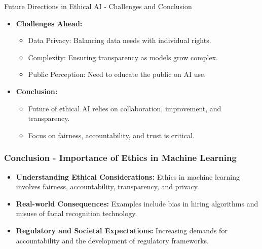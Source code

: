 \documentclass[aspectratio=169]{beamer}
\begin{document}
\begin{frame}[fragile]{Future Directions in Ethical AI - Challenges and Conclusion}
    \begin{itemize}
        \item \textbf{Challenges Ahead:}
            \begin{itemize}
                \item Data Privacy: Balancing data needs with individual rights.
                \item Complexity: Ensuring transparency as models grow complex.
                \item Public Perception: Need to educate the public on AI use.
            \end{itemize}
        
        \item \textbf{Conclusion:}
            \begin{itemize}
                \item Future of ethical AI relies on collaboration, improvement, and transparency.
                \item Focus on fairness, accountability, and trust is critical.
            \end{itemize}
    \end{itemize}
\end{frame}

\begin{frame}[fragile]
    \frametitle{Conclusion - Importance of Ethics in Machine Learning}
    \begin{itemize}
        \item \textbf{Understanding Ethical Considerations:} 
            Ethics in machine learning involves fairness, accountability, transparency, and privacy.
        \item \textbf{Real-world Consequences:}
            Examples include bias in hiring algorithms and misuse of facial recognition technology.
        \item \textbf{Regulatory and Societal Expectations:}
            Increasing demands for accountability and the development of regulatory frameworks.
    \end{itemize}
\end{frame}
\end{document}
